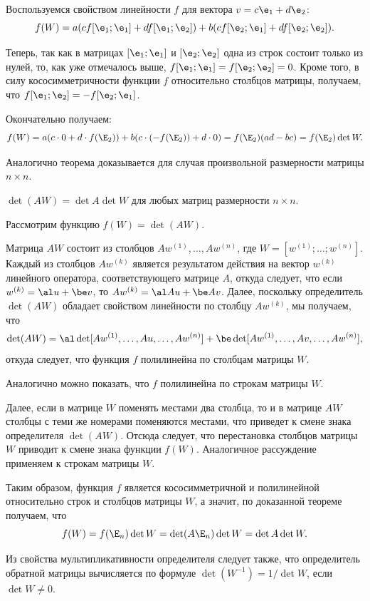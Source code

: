 \begin{enumerate}
Воспользуемся свойством линейности $f$ для вектора $v=c\e_1+d\e_2$:
$$
f(W) = a (cf[\e_1;\e_1]+df[\e_1;\e_2]) + b(cf[\e_2;\e_1] +df[\e_2;\e_2]).
$$

Теперь, так как в матрицах $[\e_1;\e_1]$ и $[\e_2;\e_2]$ одна из строк состоит только из нулей, то, как уже отмечалось выше, $f[\e_1;\e_1]=f[\e_2;\e_2]=0$. Кроме того, в силу кососимметричности функции $f$ относительно столбцов матрицы, получаем, что $f[\e_1;\e_2]=-f[\e_2;\e_1]$.

Окончательно получаем:
$$
f(W)= a (c\cdot 0+ d\cdot f(\E_2)) + b(c\cdot(-f(\E_2))+d\cdot 0)=f(\E_2)(ad-bc)=f(\E_2)\det W.
$$

Аналогично теорема доказывается для случая произвольной размерности матрицы $n\times n$.
\epf

\begin{sled} $\det(AW)=\det A\det W$ для любых матриц размерности $n\times n$.
\end{sled}
\pf
Рассмотрим функцию $f(W)=\det(AW)$.

Матрица $AW$ состоит из столбцов $Aw^{(1)},\dots,Aw^{(n)}$, где $W=[w^{(1)};\dots;w^{(n)}]$. Каждый из столбцов $Aw^{(k)}$ является результатом действия на вектор $w^{(k)}$ линейного оператора, соответствующего матрице $A$, откуда следует, что если $w^{(k)}=\al u+\be v$, то $Aw^{(k)}=\al Au+\be Av$. Далее, поскольку определитель $\det(AW)$ обладает свойством линейности по столбцу $Aw^{(k)}$, мы получаем, что
$$
\det(AW) = \al \det[Aw^{(1)},\dots,Au,\dots,Aw^{(n)}]+\be\det[Aw^{(1)},\dots,Av,\dots,Aw^{(n)}],
$$
откуда следует, что функция $f$ полилинейна по столбцам матрицы $W$. 

Аналогично можно показать, что $f$ полилинейна по строкам матрицы $W$.

Далее, если в матрице $W$ поменять местами два столбца, то и в матрице $AW$ столбцы с теми же номерами поменяются местами, что приведет к смене знака определителя $\det(AW)$. Отсюда следует, что перестановка столбцов матрицы $W$ приводит к смене знака функции $f(W)$. Аналогичное рассуждение применяем к строкам матрицы $W$.

Таким образом, функция $f$ является кососимметричной и полилинейной относительно строк и столбцов матрицы $W$, а значит, по доказанной теореме получаем, что
$$
f(W)=f(\E_n)\det W=\det(A\E_n)\det W=\det A\det W.
$$
\epf

Из свойства мультипликативности определителя следует также, что определитель обратной матрицы вычисляется по формуле $\det(W^{-1})=1/\det W$, если $\det W\ne 0$.



\end{enumerate}
